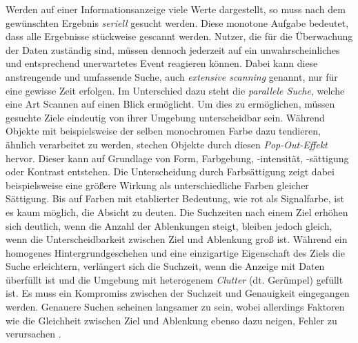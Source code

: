 Werden auf einer Informationsanzeige viele Werte dargestellt, so muss nach dem gewünschten Ergebnis \textit{seriell} gesucht werden. Diese monotone Aufgabe bedeutet, dass alle Ergebnisse stückweise gescannt werden.
Nutzer, die für die Überwachung der Daten zuständig sind, müssen dennoch jederzeit auf ein unwahrscheinliches und entsprechend unerwartetes Event reagieren können. Dabei kann diese anstrengende und umfassende Suche, auch \textit{extensive scanning} genannt, nur für eine gewisse Zeit erfolgen.
Im Unterschied dazu steht die \textit{parallele Suche}, welche eine Art Scannen auf einen Blick ermöglicht. Um dies zu ermöglichen, müssen gesuchte Ziele eindeutig von ihrer Umgebung unterscheidbar sein. Während Objekte mit beispielsweise der selben monochromen Farbe dazu tendieren, ähnlich verarbeitet zu werden, stechen Objekte durch diesen \textit{Pop-Out-Effekt} hervor. Dieser kann auf Grundlage von Form, Farbgebung, -intensität, -sättigung oder Kontrast entstehen. Die Unterscheidung durch Farbsättigung zeigt dabei beispielsweise eine größere Wirkung als unterschiedliche Farben gleicher Sättigung. Bis auf Farben mit etablierter Bedeutung, wie rot als Signalfarbe, ist es kaum möglich, die Absicht zu deuten.
Die Suchzeiten nach einem Ziel erhöhen sich deutlich, wenn die Anzahl der Ablenkungen steigt, bleiben jedoch gleich, wenn die Unterscheidbarkeit zwischen Ziel und Ablenkung groß ist.
Während ein homogenes Hintergrundgeschehen und eine einzigartige Eigenschaft des Ziels die Suche erleichtern, verlängert sich die Suchzeit, wenn die Anzeige mit Daten überfüllt ist und die Umgebung mit heterogenem \textit{Clutter} (dt. Gerümpel) gefüllt ist.
Es muss ein Kompromiss zwischen der Suchzeit und Genauigkeit eingegangen werden. Genauere Suchen scheinen langsamer zu sein, wobei allerdings Faktoren wie die Gleichheit zwischen Ziel und Ablenkung ebenso dazu neigen, Fehler zu verursachen \cites[S. 35, 89, 90\psqq]{Vollrath:2015:Taschenbuch}[S. 58\psqq, 96\psq]{Wickens:2013}.



